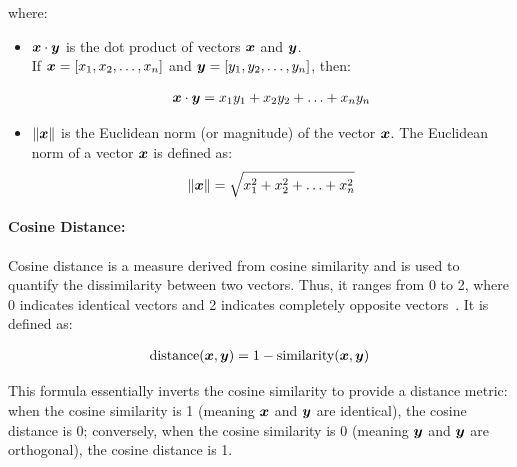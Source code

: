 where:
\begin{itemize}
    \item \( \displaystyle {\bm{x}} \cdot \displaystyle {\bm{y}} \) is the dot product of vectors \( \displaystyle {\bm{x}} \) and \( \displaystyle {\bm{y}} \).\\
    If \( \displaystyle {\bm{x}} = [x_1, x_2, \ldots, x_n] \) and \( \displaystyle {\bm{y}} = [y_1, y_2, \ldots, y_n] \), then:

    \begin{equation}
    \begin{aligned}
    \displaystyle {\bm{x}} \cdot \displaystyle {\bm{y}} = x_1y_1 + x_2y_2 + \ldots + x_ny_n
    \end{aligned}
    \label{equation:4.14}
    \end{equation}
    
    \item \( \|\displaystyle {\bm{x}}\| \) is the Euclidean norm (or magnitude) of the vector \( \displaystyle {\bm{x}} \).
    The Euclidean norm of a vector \( \displaystyle {\bm{x}} \) is defined as:
    \begin{equation}
    \begin{aligned}
    \|\displaystyle {\bm{x}}\| = \sqrt{x_1^2 + x_2^2 + \ldots + x_n^2}
    \end{aligned}
    \label{equation:4.15}
    \end{equation}
    
\end{itemize}

\paragraph{Cosine Distance:}
Cosine distance is a measure derived from cosine similarity and is used to quantify the dissimilarity between two vectors. Thus, it ranges from 0 to 2, where 0 indicates identical vectors and 2 indicates completely opposite vectors~\citep{wikipedia_cosine_similarity}. It is defined as:

\begin{equation}
\begin{aligned}
\text{distance}(\displaystyle {\bm{x}}, \displaystyle {\bm{y}}) = 1 - \text{similarity}(\displaystyle {\bm{x}}, \displaystyle {\bm{y}})
\end{aligned}
\label{equation:4.16}
\end{equation}

This formula essentially inverts the cosine similarity to provide a distance metric: when the cosine similarity is 1 (meaning \( \displaystyle {\bm{x}} \) and \( \displaystyle {\bm{y}} \) are identical), the cosine distance is 0; conversely, when the cosine similarity is 0 (meaning \( \displaystyle {\bm{y}} \) and \( \displaystyle {\bm{y}} \) are orthogonal), the cosine distance is 1.
